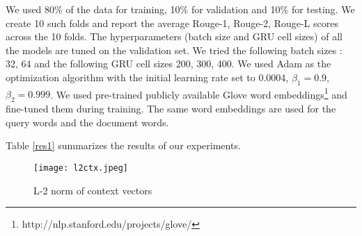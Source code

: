 \documentclass[11pt]{article}
\begin{document}
We used 80\% of the data for training, 10\% for validation and 10\% for testing. We create 10 such folds and report the average Rouge-1, Rouge-2, Rouge-L scores across the 10 folds. The hyperparameters (batch size and GRU cell sizes) of all the models are tuned on the validation set. We tried the following batch sizes : {32, 64} and the following GRU cell sizes {200, 300, 400}. We used Adam \cite{kingma2014adam} as the optimization algorithm with the initial learning rate set to 0.0004, $\beta_1=0.9$, $\beta_2=0.999$. We used pre-trained publicly available Glove word embeddings\footnote{http://nlp.stanford.edu/projects/glove/} and fine-tuned them during training. The same word embeddings are used for the query words and the document words.

Table \ref{res1} summarizes the results of our experiments.

\begin{center}
\begin{table}[h]
\vspace{1pt}
\caption{Performance on various models using full-length ROUGE metrics}
\label{res1}
\end{table}
\end{center}

\begin{figure}
\texttt{[image: l2ctx.jpeg]}
\caption{L-2 norm of context vectors}
\label{ctx}
\end{figure}
\fi
\end{document}

